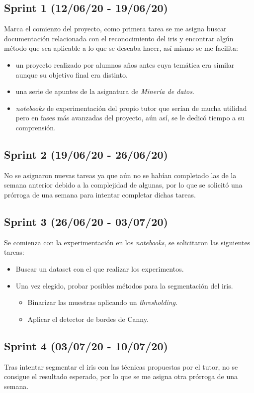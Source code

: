 \subsection{Sprint 1 (12/06/20 - 19/06/20)} \label{sp1}
Marca el comienzo del proyecto, como primera tarea se me asigna buscar documentación relacionada con el reconocimiento del iris y encontrar algún método que sea aplicable a lo que se deseaba hacer, así mismo se me facilita:
\begin{itemize}
    \item un proyecto realizado por alumnos años antes cuya temática era similar aunque su objetivo final era distinto.
    \item una serie de apuntes de la asignatura de \emph{Minería de datos}.
    \item \emph{notebooks} de experimentación del propio tutor que serían de mucha utilidad pero en fases más avanzadas del proyecto, aún así, se le dedicó tiempo a su comprensión.
\end{itemize}

\subsection{Sprint 2 (19/06/20 - 26/06/20)}
No se asignaron nuevas tareas ya que aún no se habían completado las de la semana anterior debido a la complejidad de algunas, por lo que se solicitó una prórroga de una semana para intentar completar dichas tareas.
\subsection{Sprint 3 (26/06/20 - 03/07/20)}
Se comienza con la experimentación en los \emph{notebooks}, se solicitaron las siguientes tareas:
\begin{itemize}
    \item Buscar un dataset con el que realizar los experimentos.
    \item Una vez elegido, probar posibles métodos para la segmentación del iris.
    \begin{itemize}
        \item Binarizar las muestras aplicando un \emph{thresholding}.
        \item Aplicar el detector de bordes de Canny.
    \end{itemize}
\end{itemize}
\subsection{Sprint 4 (03/07/20 - 10/07/20)}
Tras intentar segmentar el iris con las técnicas propuestas por el tutor, no se consigue el resultado esperado, por lo que se me asigna otra prórroga de una semana.

